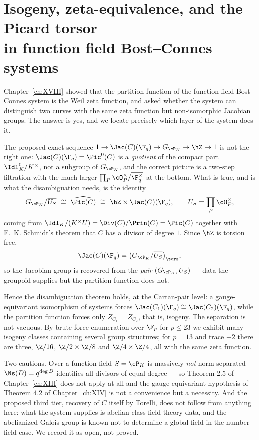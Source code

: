 \chapter[Isogeny and the Picard torsor]{Isogeny, zeta-equivalence, and the Picard torsor\\ in function field Bost--Connes systems}\label{ch:XIX}
\begin{summary}
Chapter~\ref{ch:XVIII} showed that the partition function of the function field
Bost--Connes system is the Weil zeta function, and asked whether the system can distinguish
two curves with the same zeta function but non-isomorphic Jacobian groups. The answer is yes,
and we locate precisely which layer of the system does it.

The proposed exact sequence $1\to\Jac(C)(\F_q)\to G_{\cP_K}\to\hZ\to1$ is not the right one:
$\Jac(C)(\F_q)=\Pic^0(C)$ is a \emph{quotient} of the compact part
$\Idl^0_K/K^\times$, not a subgroup of $G_{\cP_K}$, and the correct picture is a two-step
filtration with the much larger $\prod_P\cO_P^\times/\overline{\F_q^\times}$ at the bottom.
What is true, and is what the disambiguation needs, is the identity
\[
G_{\cP_K}\big/\overline{U_S}\ \cong\ \widehat{\Pic(C)}\ \cong\ \hZ\times\Jac(C)(\F_q),
\qquad U_S=\prod_P\cO_P^\times,
\]
coming from $\Idl_K/(K^\times U)=\Div(C)/\Prin(C)=\Pic(C)$ together with F.~K. Schmidt's
theorem that $C$ has a divisor of degree $1$. Since $\hZ$ is torsion free,
\[
\Jac(C)(\F_q)=\bigl(G_{\cP_K}/\overline{U_S}\bigr)_{\tors},
\]
so the Jacobian group is recovered from the \emph{pair} $(G_{\cP_K},U_S)$ --- data the
groupoid supplies but the partition function does not.

Hence the disambiguation theorem holds, at the Cartan-pair level: a gauge-equivariant
isomorphism of systems forces $\Jac(C_1)(\F_q)\cong\Jac(C_2)(\F_q)$, while the partition
function forces only $Z_{C_1}=Z_{C_2}$, that is, isogeny. The separation is not vacuous. By
brute-force enumeration over $\F_p$ for $p\le23$ we exhibit many isogeny classes containing
several group structures; for $p=13$ and trace $-2$ there are three,
$\Z/16$, $\Z/2\times\Z/8$ and $\Z/4\times\Z/4$, all with the same zeta function.

Two cautions. Over a function field $S=\cP_K$ is massively \emph{not} norm-separated ---
$\Ns(D)=q^{\deg D}$ identifies all divisors of equal degree --- so Theorem 2.5 of Chapter~\ref{ch:XIII}
does not apply at all and the gauge-equivariant hypothesis of Theorem 4.2 of Chapter~\ref{ch:XIV} is
not a convenience but a necessity. And the proposed third tier, recovery of $C$ itself by
Torelli, does not follow from anything here: what the system supplies is abelian class field
theory data, and the abelianized Galois group is known not to determine a global field in the
number field case. We record it as open, not proved.
\end{summary}



